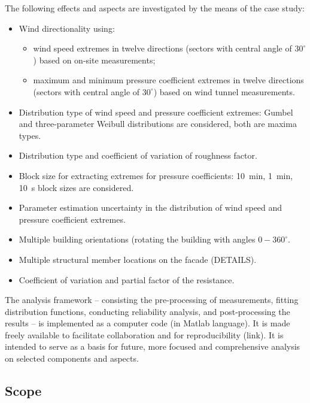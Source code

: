 \documentclass[fleqn]{article}
\begin{document}
The following effects and aspects are investigated by the means of the case study:
\begin{itemize}
	\item Wind directionality using:
	\begin{itemize}
		\item wind speed extremes in twelve directions (sectors with central angle of $30^{\circ}$) based on on-site measurements;
		\item maximum and minimum pressure coefficient extremes in twelve directions (sectors with central angle of $30^{\circ}$) based on wind tunnel measurements.
	\end{itemize}
	\item Distribution type of wind speed and pressure coefficient extremes: Gumbel and three-parameter Weibull distributions are considered, both are maxima types.
	\item Distribution type and coefficient of variation of roughness factor.
	\item Block size for extracting extremes for pressure coefficients: 10~min, 1~min, 10~s block sizes are considered.
	\item Parameter estimation uncertainty in the distribution of wind speed and pressure coefficient extremes.
	\item Multiple building orientations (rotating the building with angles $0-360^{\circ}$.
	\item Multiple structural member locations on the facade (DETAILS).
	\item Coefficient of variation and partial factor of the resistance.
\end{itemize}

The analysis framework -- consisting the pre-processing of measurements, fitting distribution functions, conducting reliability analysis, and post-processing the results -- is implemented as a computer code (in Matlab language). It is made freely available to facilitate collaboration and for reproducibility (link). It is intended to serve as a basis for future, more focused and comprehensive analysis on selected components and aspects.

\subsection{Scope}
\end{document}
